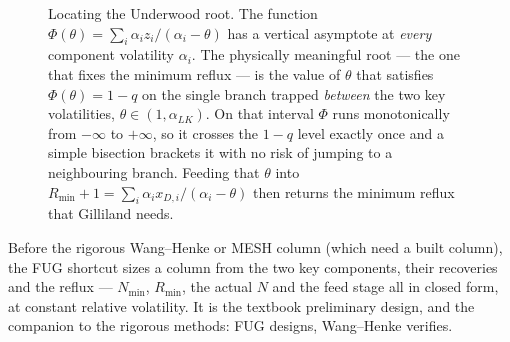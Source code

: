 \documentclass[11pt,a4paper]{article}
\begin{document}
\begin{figure}[ht]
\centering
{}
\caption{Locating the Underwood root.  The function $\Phi(\theta)=\sum_i
\alpha_i z_i/(\alpha_i-\theta)$ has a vertical asymptote at \emph{every}
component volatility $\alpha_i$.  The physically meaningful root --- the
one that fixes the minimum reflux --- is the value of $\theta$ that
satisfies $\Phi(\theta)=1-q$ on the single branch trapped \emph{between}
the two key volatilities, $\theta\in(1,\alpha_{LK})$.  On that interval
$\Phi$ runs monotonically from $-\infty$ to $+\infty$, so it crosses the
$1-q$ level exactly once and a simple bisection brackets it with no
risk of jumping to a neighbouring branch.  Feeding that $\theta$ into
$R_{\min}+1=\sum_i \alpha_i x_{D,i}/(\alpha_i-\theta)$ then returns the
minimum reflux that Gilliland needs.}
\label{fig:underwood-root}
\end{figure}


\begin{whatyoulllearn}
Before the rigorous Wang--Henke or MESH column (which need a built
column), the FUG shortcut sizes a column from the two key components,
their recoveries and the reflux --- $N_{\min}$, $R_{\min}$, the actual
$N$ and the feed stage all in closed form, at constant relative
volatility.  It is the textbook preliminary design, and the companion
to the rigorous methods: FUG designs, Wang--Henke verifies.
\end{whatyoulllearn}
\end{document}
